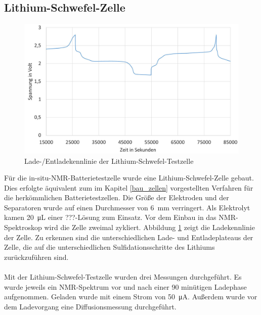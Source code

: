 \documentclass[a4paper, 11pt, headsepline,footsepline,twoside,abstract]{scrbook}
\begin{document}
\subsection{Lithium-Schwefel-Zelle}
\begin{figure}
	\centering
	\includegraphics[width=0.85\columnwidth]{images/GCPL_LiS.jpg}
	\caption{Lade-/Entladekennlinie der Lithium-Schwefel-Testzelle}
	\label{gcpl_LiS}
\end{figure} 
Für die in-situ-NMR-Batterietestzelle wurde eine Lithium-Schwefel-Zelle gebaut. Dies erfolgte äquivalent zum im Kapitel \ref{bau_zellen} vorgestellten Verfahren für die herkömmlichen Batterietestzellen. Die Größe der Elektroden und der Separatoren wurde auf einen Durchmesser von \SI{6}{\milli\meter} verringert. Als Elektrolyt kamen \SI{20}{\micro\liter} einer ???-Lösung zum Einsatz. Vor dem Einbau in das NMR-Spektroskop wird die Zelle zweimal zykliert. Abbildung \ref{gcpl_LiS} zeigt die Ladekennlinie der Zelle. Zu erkennen sind die unterschiedlichen Lade- und Entladeplateaus der Zelle, die auf die unterschiedlichen Sulfidationsschritte des Lithiums zurückzuführen sind.
\\\\
Mit der Lithium-Schwefel-Testzelle wurden drei Messungen durchgeführt. Es wurde jeweils ein NMR-Spektrum vor und nach einer 90 minütigen Ladephase aufgenommen. Geladen wurde mit einem Strom von \SI{50}{\micro\ampere}. Außerdem wurde vor dem Ladevorgang eine Diffusionsmessung durchgeführt.
\end{document}
